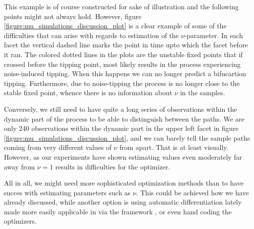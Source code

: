 This example is of course constructed for sake of illustration and the following points might not always hold. However, figure \ref{figure:mu_simulations_discussion_plot} is a clear example of some of the difficulties that can arise with regards to estimation of the $\nu$-parameter. In each facet the vertical dashed line marks the point in time upto which the facet before it ran. The colored dotted lines in the plots are the unstable fixed points that if crossed before the tipping point, most likely results in the process experiencing noise-induced tipping. When this happens we can no longer predict a bifucartion tipping. Furthermore, due to noise-tipping the process is no longer close to the stable fixed point, whence there is no information about $\nu$ in the samples.

Conversely, we still need to have quite a long series of observations within the dynamic part of the process to be able to distinguish between the paths. We are only 240 observations within the dynamic part in the upper left facet in figure \ref{figure:mu_simulations_discussion_plot}, and we can barely tell the sample paths coming from very different values of $\nu$ from apart. That is at least visually. However, as our experiments have shown estimating values even moderately far away from $\nu = 1$ results in difficulties for the optimizer. 

All in all, we might need more sophisticated optimization methods than  to have succes with estimating parameters such as $\nu$. This could be achieved how we have already discussed, while another option is using automatic differentiation lately made more easily applicable in  via the  framework \cite{torch}, or even hand coding the optimizers.

